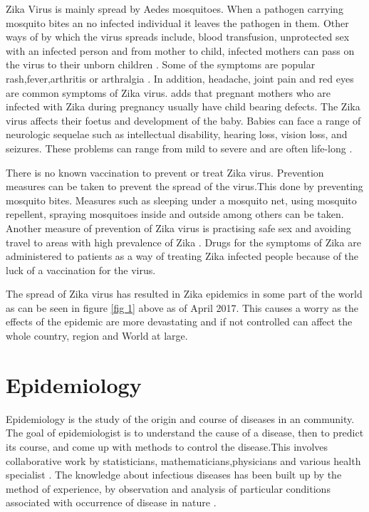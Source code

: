 Zika Virus is mainly spread by Aedes mosquitoes. When a pathogen carrying mosquito bites an no infected individual it leaves the pathogen in them. 
Other ways of by which the virus spreads include, blood transfusion, unprotected sex with an infected person and from mother to child, infected mothers can pass on the virus to their unborn children \citep{musso2014}.
 
 Some of the symptoms are popular rash,fever,arthritis or arthralgia \cite{musso2015}. In addition, headache, joint pain and red eyes are common symptoms of Zika virus. \cite{simoes2016zika}  adds that pregnant mothers who are infected with Zika during pregnancy usually have child bearing defects. The Zika virus affects their foetus and development of the baby. Babies can face a range of neurologic sequelae such as intellectual disability, hearing loss, vision loss, and seizures. These problems can range from mild to severe and are often life-long \citep{rasmussen2016zika}.

There is no known vaccination to prevent or treat  Zika virus. Prevention measures can be taken to prevent the spread of the virus.This done by preventing mosquito bites. Measures such as sleeping under a mosquito net, using mosquito repellent, spraying mosquitoes inside and outside among others can be taken. Another measure of prevention of Zika virus is practising safe sex and avoiding travel to areas with high prevalence of Zika . Drugs for the symptoms of Zika are administered to patients as a way of treating Zika infected people because of the luck of a vaccination for the virus.


The spread of Zika virus has resulted in Zika epidemics in some part of the world as can be seen in figure \ref{fig 1} above as of April 2017. This causes a worry as the effects of the epidemic are more devastating and if not controlled can affect the whole country, region and World at large. 


 \section{Epidemiology}
 
 Epidemiology is the study of the origin and course of diseases in an community. The goal of epidemiologist is to understand the cause of a disease, then to predict its course, and come up with methods to control the disease.This involves collaborative work by statisticians, mathematicians,physicians and various health specialist \citep{Brauer2017}. The knowledge about infectious diseases has been built up by the method of experience, by observation and analysis of particular conditions associated with occurrence of disease in nature \citep{frost1923importance}.
 
